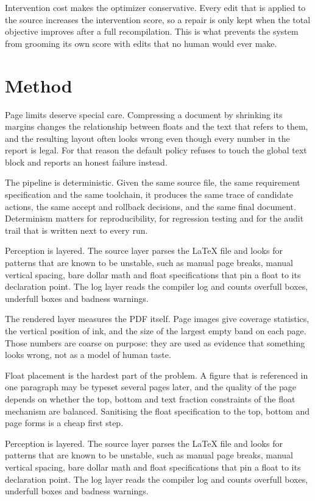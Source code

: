 \documentclass[10pt,a4paper]{article}
\begin{document}
Intervention cost makes the optimizer conservative. Every edit that is applied to the source increases the intervention score, so a repair is only kept when the total objective improves after a full recompilation. This is what prevents the system from grooming its own score with edits that no human would ever make.

\newpage

\section{Method}
Page limits deserve special care. Compressing a document by shrinking its margins changes the relationship between floats and the text that refers to them, and the resulting layout often looks wrong even though every number in the report is legal. For that reason the default policy refuses to touch the global text block and reports an honest failure instead.

The pipeline is deterministic. Given the same source file, the same requirement specification and the same toolchain, it produces the same trace of candidate actions, the same accept and rollback decisions, and the same final document. Determinism matters for reproducibility, for regression testing and for the audit trail that is written next to every run.

Perception is layered. The source layer parses the LaTeX file and looks for patterns that are known to be unstable, such as manual page breaks, manual vertical spacing, bare dollar math and float specifications that pin a float to its declaration point. The log layer reads the compiler log and counts overfull boxes, underfull boxes and badness warnings.

The rendered layer measures the PDF itself. Page images give coverage statistics, the vertical position of ink, and the size of the largest empty band on each page. Those numbers are coarse on purpose: they are used as evidence that something looks wrong, not as a model of human taste.

Float placement is the hardest part of the problem. A figure that is referenced in one paragraph may be typeset several pages later, and the quality of the page depends on whether the top, bottom and text fraction constraints of the float mechanism are balanced. Sanitising the float specification to the top, bottom and page forms is a cheap first step.

Perception is layered. The source layer parses the LaTeX file and looks for patterns that are known to be unstable, such as manual page breaks, manual vertical spacing, bare dollar math and float specifications that pin a float to its declaration point. The log layer reads the compiler log and counts overfull boxes, underfull boxes and badness warnings.
\end{document}
